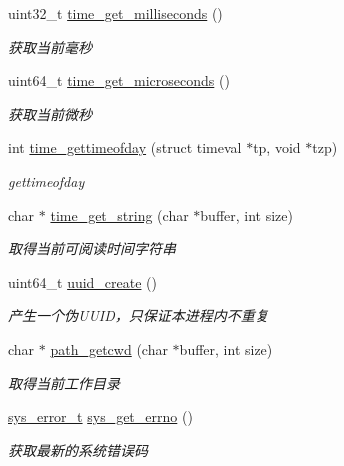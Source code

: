 \begin{DoxyCompactItemize}
uint32\+\_\+t \hyperlink{a00063_a528d27a7218cb2fdabf81ca343e24fc9_a528d27a7218cb2fdabf81ca343e24fc9}{time\+\_\+get\+\_\+milliseconds} ()
\begin{DoxyCompactList}\small\item\em 获取当前毫秒 \end{DoxyCompactList}\item 
uint64\+\_\+t \hyperlink{a00063_a5eb6de730bc28be3fbc402b9841c1819_a5eb6de730bc28be3fbc402b9841c1819}{time\+\_\+get\+\_\+microseconds} ()
\begin{DoxyCompactList}\small\item\em 获取当前微秒 \end{DoxyCompactList}\item 
int \hyperlink{a00063_a3cab12b4908938ca999206a67c8ee032_a3cab12b4908938ca999206a67c8ee032}{time\+\_\+gettimeofday} (struct timeval $\ast$tp, void $\ast$tzp)
\begin{DoxyCompactList}\small\item\em gettimeofday \end{DoxyCompactList}\item 
char $\ast$ \hyperlink{a00063_a6d3f7fda67a3c61f767f7b2dbfcbe4ee_a6d3f7fda67a3c61f767f7b2dbfcbe4ee}{time\+\_\+get\+\_\+string} (char $\ast$buffer, int size)
\begin{DoxyCompactList}\small\item\em 取得当前可阅读时间字符串 \end{DoxyCompactList}\item 
uint64\+\_\+t \hyperlink{a00063_a2b1df51bc127460a3bf25949068bfe92_a2b1df51bc127460a3bf25949068bfe92}{uuid\+\_\+create} ()
\begin{DoxyCompactList}\small\item\em 产生一个伪\+U\+U\+I\+D，只保证本进程内不重复 \end{DoxyCompactList}\item 
char $\ast$ \hyperlink{a00063_a6c98a04f00772c05a1f51afc185f7513_a6c98a04f00772c05a1f51afc185f7513}{path\+\_\+getcwd} (char $\ast$buffer, int size)
\begin{DoxyCompactList}\small\item\em 取得当前工作目录 \end{DoxyCompactList}\item 
\hyperlink{a00044_aeaea39e7ef5adeec1efaee3eee6b12ff_aeaea39e7ef5adeec1efaee3eee6b12ff}{sys\+\_\+error\+\_\+t} \hyperlink{a00063_a2e3ede072c59452900afcb1334611dac_a2e3ede072c59452900afcb1334611dac}{sys\+\_\+get\+\_\+errno} ()
\begin{DoxyCompactList}\small\item\em 获取最新的系统错误码 \end{DoxyCompactList}\item 

\end{DoxyCompactItemize}
